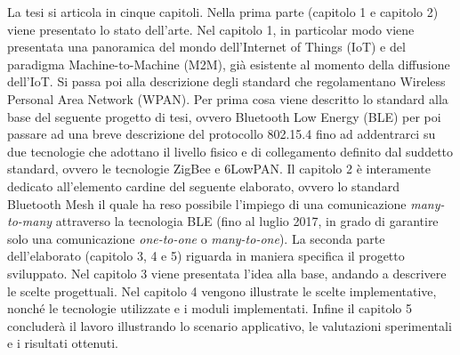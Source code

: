 \noindent La tesi si articola in cinque capitoli. 
Nella prima parte (capitolo 1 e capitolo 2) viene presentato lo stato dell’arte. Nel capitolo 1, in particolar modo viene presentata una panoramica del mondo dell'Internet of Things (IoT) e del paradigma Machine-to-Machine (M2M), già esistente al momento della diffusione dell'IoT. Si passa poi alla descrizione degli standard che regolamentano Wireless Personal Area Network (WPAN). Per prima cosa viene descritto lo standard alla base del seguente progetto di tesi, ovvero Bluetooth Low Energy (BLE) per poi passare ad una breve descrizione del protocollo 802.15.4 fino ad addentrarci su due tecnologie che adottano il livello fisico e di collegamento definito dal suddetto standard, ovvero le tecnologie ZigBee e 6LowPAN.
Il capitolo 2 è interamente dedicato all'elemento cardine del seguente elaborato, ovvero lo standard  Bluetooth Mesh il quale ha reso possibile l'impiego di una comunicazione \textit{many-to-many} attraverso la tecnologia BLE (fino al luglio 2017, in grado di garantire solo una comunicazione \textit{one-to-one} o \textit{many-to-one}).
La seconda parte dell'elaborato (capitolo 3, 4 e 5) riguarda in maniera specifica il progetto sviluppato.
Nel capitolo 3 viene presentata l'idea alla base, andando a descrivere le scelte progettuali. Nel capitolo 4 vengono illustrate le scelte implementative, nonché le tecnologie utilizzate e i moduli implementati. Infine il capitolo 5 concluderà il lavoro illustrando lo scenario applicativo, le valutazioni sperimentali e i risultati ottenuti.